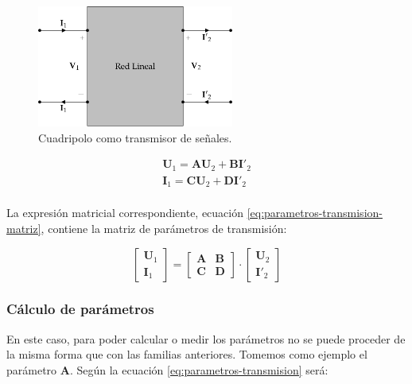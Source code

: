 \begin{figure}[H]
  \centering
  \includegraphics[height=4cm]{../figs/cuadripolo_transmision.pdf}
  \caption{Cuadripolo como transmisor de señales.}
  \label{fig:cuadripolo-transmision}
\end{figure}


\begin{equation}
  \label{eq:parametros-transmision}
  \begin{array}{l}
    \mathbf{U}_1 = \mathbf{A} \mathbf{U}_2 + \mathbf{B}\mathbf{I'}_2\\
    \mathbf{I}_1 = \mathbf{C} \mathbf{U}_2 + \mathbf{D} \mathbf{I'}_2\\
  \end{array}
\end{equation}

La expresión matricial correspondiente, ecuación \ref{eq:parametros-transmision-matriz}, contiene la matriz de parámetros de transmisión:

\begin{equation}
  \label{eq:parametros-transmision-matriz}
  \left[
    \begin{array}{c}
      \mathbf{U}_1\\
      \mathbf{I}_1
    \end{array}
  \right] =
  \left[
    \begin{array}{cc}
      \mathbf{A} & \mathbf{B}\\
      \mathbf{C} & \mathbf{D}
    \end{array}
  \right] \cdot
  \left[
    \begin{array}{c}
      \mathbf{U}_2\\
      \mathbf{I'}_2
    \end{array}
  \right]
\end{equation}

\subsubsection{Cálculo de parámetros}


En este caso, para poder calcular o medir los parámetros no se puede proceder de la misma forma que con las familias anteriores. Tomemos como ejemplo el parámetro $\mathbf{A}$. Según la ecuación \ref{eq:parametros-transmision} será:


